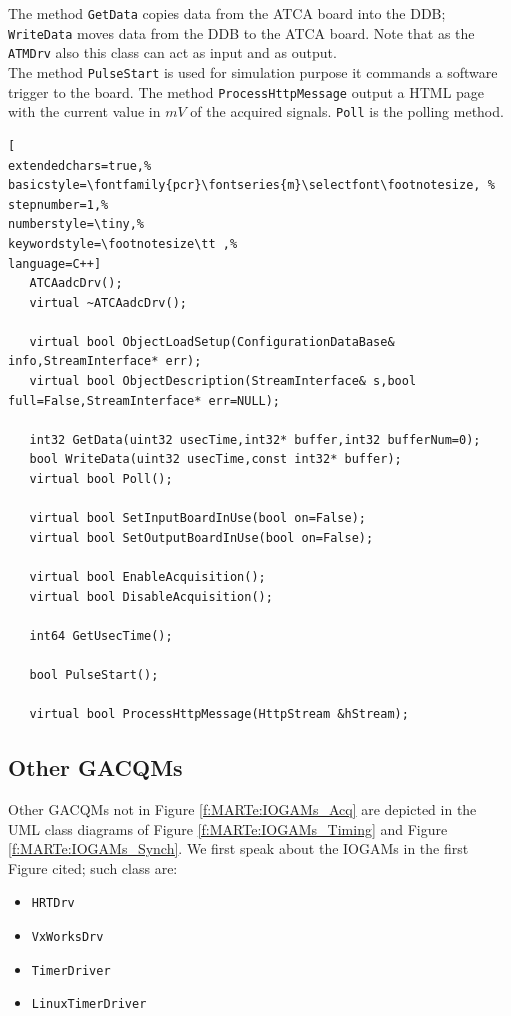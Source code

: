 The method \texttt{GetData} copies data from the ATCA board into the DDB; \texttt{WriteData} moves data from the DDB to the ATCA board. Note that as the \texttt{ATMDrv} also this class can act as input and as output. \\

The method \texttt{PulseStart} is used for simulation purpose it commands a software trigger to the board. The method \texttt{ProcessHttpMessage} output a HTML page with the current value in $mV$ of the acquired signals. \texttt{Poll} is the polling method.

\begin{lstlisting}[
extendedchars=true,%
basicstyle=\fontfamily{pcr}\fontseries{m}\selectfont\footnotesize, %
stepnumber=1,%
numberstyle=\tiny,%
keywordstyle=\footnotesize\tt ,%
language=C++]
   ATCAadcDrv();
   virtual ~ATCAadcDrv();

   virtual bool ObjectLoadSetup(ConfigurationDataBase& info,StreamInterface* err);
   virtual bool ObjectDescription(StreamInterface& s,bool full=False,StreamInterface* err=NULL);

   int32 GetData(uint32 usecTime,int32* buffer,int32 bufferNum=0);
   bool WriteData(uint32 usecTime,const int32* buffer);
   virtual bool Poll();

   virtual bool SetInputBoardInUse(bool on=False);
   virtual bool SetOutputBoardInUse(bool on=False);

   virtual bool EnableAcquisition();
   virtual bool DisableAcquisition();

   int64 GetUsecTime();

   bool PulseStart();

   virtual bool ProcessHttpMessage(HttpStream &hStream);
\end{lstlisting}



\subsection{Other GACQMs}

Other GACQMs not in Figure \ref{f:MARTe:IOGAMs_Acq} are depicted in the UML class diagrams of Figure \ref{f:MARTe:IOGAMs_Timing} and Figure \ref{f:MARTe:IOGAMs_Synch}. We first speak about the IOGAMs in the first Figure cited; such class are:

\begin{itemize}
 \item \texttt{HRTDrv}
 \item \texttt{VxWorksDrv}
 \item \texttt{TimerDriver}
 \item \texttt{LinuxTimerDriver}
\end{itemize}

